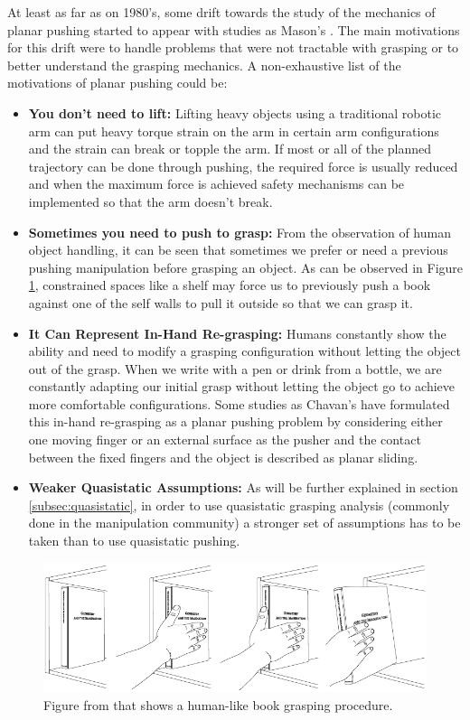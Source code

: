 \documentclass[12,twoside]{TFG-GM}
\theoremstyle{definition}
\theoremstyle{remark}
\begin{document}
At least as far as on 1980's, some drift towards the study of the mechanics of planar pushing started to appear with studies as Mason's \cite{pushing4}.
The main motivations for this drift were to handle problems that were not tractable with grasping or to better understand the grasping mechanics. A non-exhaustive list of the motivations of planar pushing could be:
\begin{itemize}
\item {\textbf{You don't need to lift:}} Lifting heavy objects using a traditional robotic arm can put heavy torque strain on the arm in certain arm configurations and the strain can break or topple the arm. If most or all of the planned trajectory can be done through pushing, the required force is usually reduced and when the maximum force is achieved safety mechanisms can be implemented so that the arm doesn't break.
\item {\textbf{Sometimes you need to push to grasp:}} From the observation of human object handling, it can be seen that sometimes we prefer or need a previous pushing manipulation before grasping an object. As can be observed in Figure \ref{fig:book}, constrained spaces like a shelf may force us to previously push a book against one of the self walls to pull it outside so that we can grasp it.
\item{\textbf{It Can Represent In-Hand Re-grasping:}} Humans constantly show the ability and need to modify a grasping configuration without letting the object out of the grasp. When we write with a pen or drink from a bottle, we are constantly adapting our initial grasp without letting the object go to achieve more comfortable configurations. Some studies as Chavan's \cite{nik1} \cite{nik2} have formulated this in-hand re-grasping as a planar pushing problem by considering either one moving finger or an external surface as the pusher and the contact between the fixed fingers and the object is described as planar sliding.
\item{\textbf{Weaker Quasistatic Assumptions:}} As will be further explained in section \ref{subsec:quasistatic}, in order to use quasistatic grasping analysis (commonly done in the manipulation community) a stronger set of assumptions has to be taken than to use quasistatic pushing.
\end{itemize}

\begin{figure}[htb!]
\begin{center}
\includegraphics[width=16cm]{ManipulationBook.pdf}
\end{center}
\caption[test caption]{\label{fig:book} \small{Figure from \protect\cite{fom} that shows a human-like book grasping procedure.}}
\end{figure}
\end{document}
